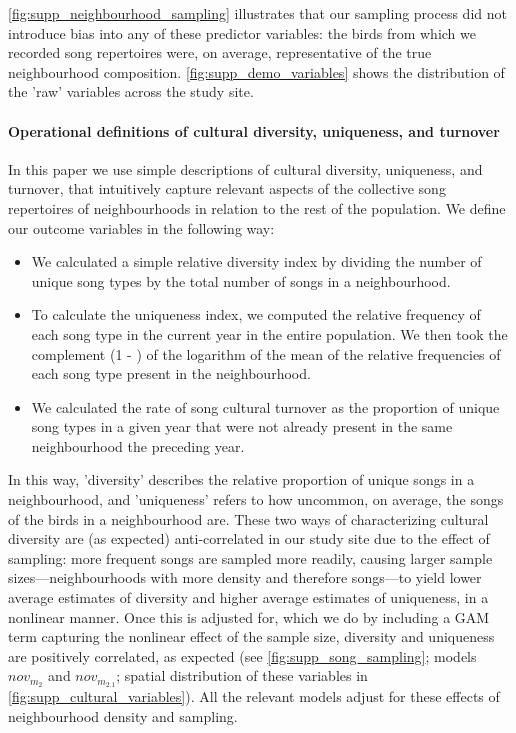 \noindent\autoref{fig:supp_neighbourhood_sampling} illustrates that our sampling process did not introduce bias into any of these predictor variables: the birds from which we recorded song repertoires were, on average, representative of the true neighbourhood composition. \autoref{fig:supp_demo_variables} shows the distribution of the 'raw' variables across the study site.

\paragraph{Operational definitions of cultural diversity, uniqueness, and turnover}

In this paper we use simple descriptions of cultural diversity, uniqueness, and turnover, that intuitively capture relevant aspects of the collective song repertoires of neighbourhoods in relation to the rest of the population. We define our outcome variables in the following way:
\begin{itemize}
    \item We calculated a simple relative diversity index by dividing the number of unique song types by the total number of songs in a neighbourhood. 
    \item To calculate the uniqueness index, we computed the relative frequency of each song type in the current year in the entire population. We then took the complement (1 - ) of the logarithm of the mean of the relative frequencies of each song type present in the neighbourhood. 
    \item We calculated the rate of song cultural turnover as the proportion of unique song types in a given year that were not already present in the same neighbourhood the preceding year.
\end{itemize}

In this way, 'diversity' describes the relative proportion of unique songs in a neighbourhood, and 'uniqueness' refers to how uncommon, on average, the songs of the birds in a neighbourhood are. These two ways of characterizing cultural diversity are (as expected) anti-correlated in our study site due to the effect of sampling: more frequent songs are sampled more readily, causing larger sample sizes---neighbourhoods with more density and therefore songs---to yield lower average estimates of diversity and higher average estimates of uniqueness, in a nonlinear manner. Once this is adjusted for, which we do by including  a GAM term capturing the nonlinear effect of the sample size, diversity and uniqueness are positively correlated, as expected (see \autoref{fig:supp_song_sampling}; models $nov_{m_2}$ and $nov_{m_{2.1}}$; spatial distribution of these variables in \autoref{fig:supp_cultural_variables}). All the relevant models adjust for these effects of neighbourhood density and sampling.

